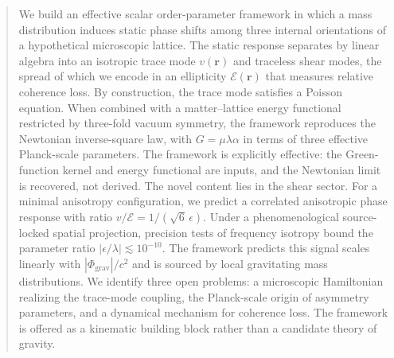 \documentclass[a4paper,fleqn]{cas-dc}
\theoremstyle{thmstyleone}%
\theoremstyle{thmstyletwo}%
\begin{document}


\fntext[1]{}


\begin{abstract}
We build an effective scalar order-parameter framework in
which a mass distribution induces static phase shifts among three
internal orientations of a hypothetical microscopic lattice.
The static response separates by linear algebra into an
isotropic trace mode $v(\mathbf{r})$ and 
traceless shear modes, the spread of which we encode in an 
ellipticity $\mathcal{E}(\mathbf{r})$ that measures relative 
coherence loss. By construction, the trace mode satisfies a Poisson 
equation. When combined with a matter--lattice energy functional 
restricted by three-fold vacuum symmetry, the framework reproduces 
the Newtonian inverse-square law, with $G=\mu\lambda\alpha$ 
in terms of three effective Planck-scale parameters.
The framework is explicitly effective: the Green-function kernel 
and energy functional are inputs, and the Newtonian limit is 
recovered, not derived. The novel content lies in the shear sector. 
For a minimal anisotropy configuration, we predict a correlated 
anisotropic phase response with ratio $v/\mathcal{E}=1/(\sqrt{6}\,\epsilon)$. 
Under a phenomenological source-locked spatial projection, precision tests 
of frequency isotropy bound the parameter ratio $|\epsilon/\lambda| \lesssim 10^{-10}$. 
The framework predicts this signal scales linearly with 
$|\Phi_{\mathrm{grav}}|/c^2$ and is sourced by local gravitating mass 
distributions. We identify three open problems: a microscopic Hamiltonian 
realizing the trace-mode coupling, the Planck-scale origin of asymmetry 
parameters, and a dynamical mechanism for coherence loss. The framework 
is offered as a kinematic building block rather than a candidate theory 
of gravity.
\end{abstract}

\end{document}
